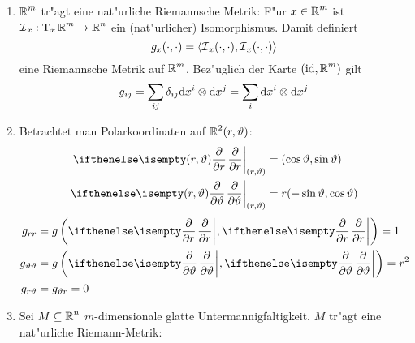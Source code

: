 \begin{bsp}\begin{enumerate}[label=\arabic*),leftmargin=*]
\item
	$\operatorname{\mathbb{R}}^m$ tr"agt eine nat"urliche Riemannsche Metrik: F"ur $x \in \operatorname{\mathbb{R}}^m$ ist $\operatorname{\mathcal{I}}_x: \operatorname{T}_x\operatorname{\mathbb{R}}^m \to \operatorname{\mathbb{R}}^n$ ein (nat"urlicher) Isomorphismus. Damit definiert
		\[ g_x(\cdot,\cdot) = \langle \operatorname{\mathcal{I}}_x(\cdot,\cdot), \operatorname{\mathcal{I}}_x(\cdot,\cdot) \rangle \]
	eine Riemannsche Metrik auf $\operatorname{\mathbb{R}}^m$. Bez"uglich der Karte $(\operatorname{id}, \operatorname{\mathbb{R}}^m)$ gilt
		\[ g_{ij} = \sum_{ij} \delta_{ij} \mathrm{d} x^{i} \otimes \mathrm{d} x^j = \sum_i \mathrm{d} x^{i} \otimes \mathrm{d} x^j \]
\item
	Betrachtet man Polarkoordinaten auf $\operatorname{\mathbb{R}}^2(r, \vartheta)$:
	\begin{align*}
		\pdifffrac[(r,\vartheta)]{}{r} &= (\cos \vartheta, \sin \vartheta)\\
		\pdifffrac[(r,\vartheta)]{}{\vartheta} &= r(-\sin \vartheta, \cos \vartheta)
	\end{align*}
	\begin{align*}
		g_{rr} &= g\left( \pdifffrac{}{r}, \pdifffrac{}{r} \right) = 1\\
		g_{\vartheta\vartheta} &= g\left( \pdifffrac{}{\vartheta}, \pdifffrac{}{\vartheta} \right) = r^2\\
		g_{r\vartheta} &= g_{\vartheta r} = 0
	\end{align*}
\item
	Sei $M \subseteq \operatorname{\mathbb{R}}^n$ $m$-dimensionale glatte Untermannigfaltigkeit. $M$ tr"agt eine nat"urliche Riemann-Metrik:
	\begin{center}
\end{center}
\end{enumerate}
\end{bsp}
